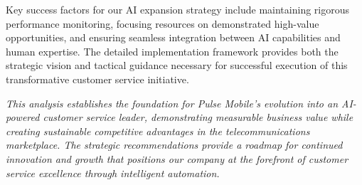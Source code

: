 \documentclass[
  letterpaper,
  DIV=11,
  numbers=noendperiod]{scrartcl}
\begin{document}
Key success factors for our AI expansion strategy include maintaining
rigorous performance monitoring, focusing resources on demonstrated
high-value opportunities, and ensuring seamless integration between AI
capabilities and human expertise. The detailed implementation framework
provides both the strategic vision and tactical guidance necessary for
successful execution of this transformative customer service initiative.

\emph{This analysis establishes the foundation for Pulse Mobile's
evolution into an AI-powered customer service leader, demonstrating
measurable business value while creating sustainable competitive
advantages in the telecommunications marketplace. The strategic
recommendations provide a roadmap for continued innovation and growth
that positions our company at the forefront of customer service
excellence through intelligent automation.}
\end{document}

